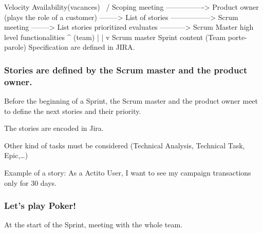 \documentclass[a4paper, 11pt]{article}
\begin{document}
                                                                                                                                                                                                Velocity        Availability(vacances)
                                                                                                                                                                                                      \         /
    Scoping meeting ----------------> Product owner (plays the role of a customer) --------> List of stories -----------------> Scrum meeting --------> List stories prioritized evaluates -----------> Scrum Master
                    high level functionalities                                                      ^                               (team)                                                                  |
                                                                                                    |                                                                                                       v
                                                                                               Scrum master                                                                                             Sprint content
                                                                                               (Team porte-parole)
    Specification are defined in JIRA.\@

    \subsubsection{Stories are defined by the Scrum master and the product owner.}

    Before the beginning of a Sprint, the Scrum master and the product owner meet to define
    the next stories and their priority.

    The stories are encoded in Jira.

    Other kind of tasks must be considered (Technical Analysis, Technical Task, Epic,\ldots)

    Example of a story: As a Actito User, I want to see my campaign transactions only for
    30 days.

    \subsubsection{Let's play Poker!}

    At the start of the Sprint, meeting with the whole team.
\end{document}
